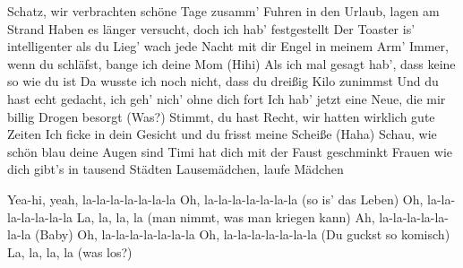 \begin{guitar}
	Schatz, wir verbrachten schöne Tage zusamm'
	Fuhren in den Urlaub, lagen am Strand
	Haben es länger versucht, doch ich hab' festgestellt
	Der Toaster is' intelligenter als du
	Lieg' wach jede Nacht mit dir Engel in meinem Arm'
	Immer, wenn du schläfst, bange ich deine Mom (Hihi)
	Als ich mal gesagt hab', dass keine so wie du ist
	Da wusste ich noch nicht, dass du dreißig Kilo zunimmst
	Und du hast echt gedacht, ich geh' nich' ohne dich fort
	Ich hab' jetzt eine Neue, die mir billig Drogen besorgt (Was?)
	Stimmt, du hast Recht, wir hatten wirklich gute Zeiten
	Ich ficke in dein Gesicht und du frisst meine Scheiße (Haha)
	Schau, wie schön blau deine Augen sind
	Timi hat dich mit der Faust geschminkt
	Frauen wie dich gibt's in tausend Städten
	Lausemädchen, laufe Mädchen
	
	 
	
	Yea-hi, yeah, la-la-la-la-la-la-la
	Oh, la-la-la-la-la-la-la (so is' das Leben)
	Oh, la-la-la-la-la-la-la
	La, la, la, la (man nimmt, was man kriegen kann)
	Ah, la-la-la-la-la-la-la (Baby)
	Oh, la-la-la-la-la-la-la
	Oh, la-la-la-la-la-la-la (Du guckst so komisch)
	La, la, la, la (was los?)
	
	  \hspace*{\fill} \end{guitar}